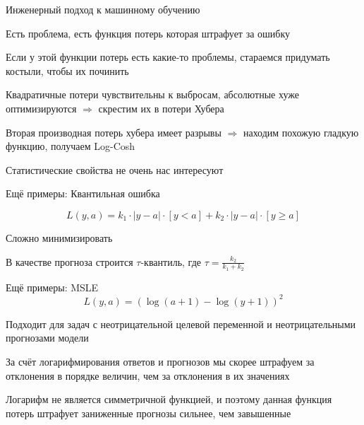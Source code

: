 \documentclass[notes,12pt, aspectratio=169]{beamer}
\newenvironment{wideitemize}{\itemize\addtolength{\itemsep}{10pt}}{\enditemize}
\begin{document}
\begin{frame}{Инженерный подход к машинному обучению}
	\begin{wideitemize}
		\item Есть проблема, есть функция потерь которая штрафует за ошибку
		
		\item  Если у этой функции потерь есть какие-то проблемы, стараемся придумать костыли, чтобы их починить 
		
		\item Квадратичные потери чувствительны к выбросам, абсолютные хуже оптимизируются $\Rightarrow$ скрестим их в потери Хубера
		
		\item Вторая производная потерь хубера имеет разрывы $\Rightarrow$  находим похожую гладкую функцию, получаем Log-Cosh
		
		\item Статистические свойства не очень нас интересуют
	\end{wideitemize}
\end{frame} 


\begin{frame}{Ещё примеры: Квантильная  ошибка}
	
	\[
	L(y, a) = k_1 \cdot |y -  a| \cdot  [y < a]    +  k_2 \cdot |y - a| \cdot  [y \ge a]
	\]
	
	\begin{wideitemize}
		
		\item  Сложно минимизировать
		
		\item  В качестве прогноза строится $\tau$-квантиль, где $\tau = \frac{k_2}{k_1 + k_2}$
	\end{wideitemize}
\end{frame}



\begin{frame}{Ещё примеры: MSLE}
	\[
	L(y, a) = (\log(a + 1) - \log(y + 1))^2
	\]
	
	\begin{wideitemize}
		
		\item  Подходит для задач с неотрицательной целевой переменной и неотрицательными прогнозами модели
		
		\item  За счёт логарифмирования ответов и прогнозов мы скорее штрафуем за отклонения
		в порядке величин, чем за отклонения в их значениях
		
		\item Логарифм не является симметричной функцией,
		и поэтому данная функция потерь штрафует заниженные прогнозы сильнее,
		чем завышенные
	\end{wideitemize}

\end{frame}
\end{document}
